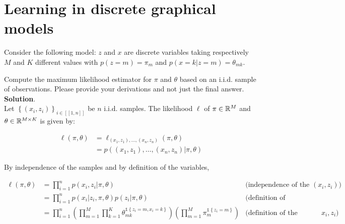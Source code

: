 \documentclass[a4paper, 11pt]{report}
\begin{document}

\maketitle

\chapter{Learning in discrete graphical models}

Consider the following model: $z$ and $x$ are discrete variables taking respectively $M$ and $K$ different values with $p(z=m) = \pi_m$ and $p(x=k|z=m) = \theta_{mk}$.

Compute the maximum likelihood estimator for $\pi$ and $\theta$ based on an i.i.d. sample of observations. Please provide your derivations and not just the final answer. \\

\textbf{Solution}. \\

Let $\left\{ (x_i, z_i) \right\}_{i \in [\![ 1, n ]\!]}$ be $n$ i.i.d. samples. The likelihood $\ell$ of $\pi \in \mathbb{R}^{M}$ and $\theta \in \mathbb{R}^{M \times K}$ is given by:

\begin{equation*}
    \begin{aligned}
    \ell \left( \pi, \theta \right) &= \ell_{(x_1, z_1), \dots, (x_n, z_n)}(\pi, \theta) \\
    &= p \left( (x_1, z_1), \dots, (x_n, z_n) | \pi, \theta \right)
    \end{aligned}
\end{equation*}
\vspace*{.6em}

By independence of the samples and by definition of the variables,

\begin{equation*}
    \begin{aligned}
    \ell \left( \pi, \theta \right) &= \prod_{i=1}^{n} p \left( x_i, z_i | \pi, \theta \right) & \text{(independence of the $(x_i, z_i)$)} \\
    &= \prod_{i=1}^{n} p \left( x_i | z_i, \pi, \theta \right) p \left( z_i | \pi, \theta \right) & \text{(definition of conditional distribution)} \\
    &= \prod_{i=1}^{n} \left( \prod_{m=1}^{M} \prod_{k=1}^{K} \theta_{mk}^{\mathds{1} \left\{ z_i = m, x_i = k \right\}} \right) \left( \prod_{m=1}^{M} \pi_{m}^{\mathds{1} \left\{ z_i = m \right\}} \right) & \text{(definition of the variables $x_i, z_i$)}
    \end{aligned}
\end{equation*}
\vspace*{.6em}
\end{document}
